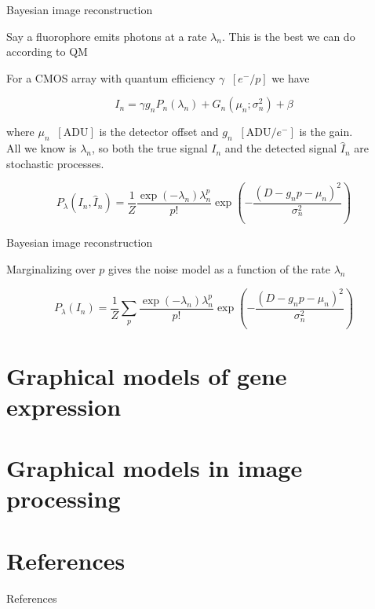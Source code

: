 \documentclass{beamer}					%
\begin{document}
\begin{frame}{Bayesian image reconstruction}

Say a fluorophore emits photons at a rate $\lambda_{n}$. This is the best we can do according to QM
\vspace{0.1in}

For a CMOS array with quantum efficiency $\gamma\;\;[e^{-}/p]$ we have

\begin{equation*}
I_{n} = \gamma g_{n}P_{n}(\lambda_{n}) + G_{n}(\mu_{n};\sigma_{n}^{2}) + \beta
\end{equation*}

where $\mu_{n} \;\;[\mathrm{ADU}]$ is the detector offset and $g_{n}\;\; [\mathrm{ADU}/e^{-}]$ is the gain. \\
\vspace{0.2in}
All we know is $\lambda_{n}$, so both the true signal $I_{n}$ and the detected signal $\hat{I}_{n}$ are stochastic processes. 

\begin{equation*}
P_{\lambda}(I_{n},\hat{I}_{n}) = \frac{1}{Z}\frac{\exp\left({-\lambda_{n}}\right)\lambda_{n}^{p}}{p!}\exp\left(-\frac{(D-g_{n}p-\mu_{n})^{2}}{\sigma_{n}^{2}}\right)
\end{equation*}

\end{frame}


\begin{frame}{Bayesian image reconstruction}

Marginalizing over $p$ gives the noise model as a function of the rate $\lambda_{n}$

\begin{equation*}
P_{\lambda}(I_{n}) = \frac{1}{Z}\sum_{p}\frac{\exp\left({-\lambda_{n}}\right)\lambda_{n}^{p}}{p!}\exp\left(-\frac{(D-g_{n}p-\mu_{n})^{2}}{\sigma_{n}^{2}}\right)
\end{equation*}



\end{frame}




\section{Graphical models of gene expression}




\section{Graphical models in image processing}



\section{References}

\begin{frame}[allowframebreaks]{References}
	\tiny
	
\end{frame}
\end{document}
